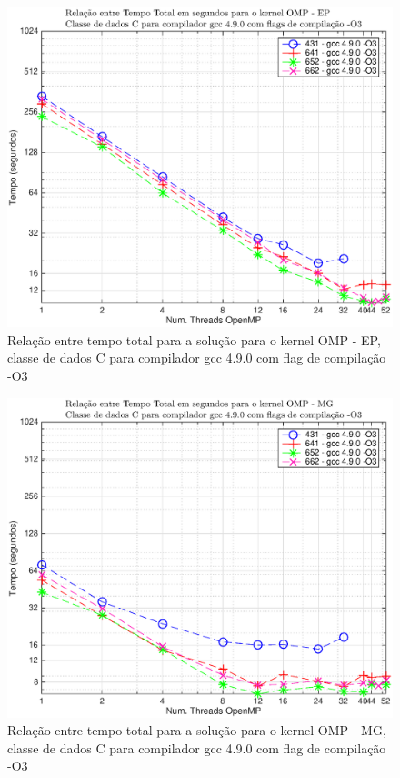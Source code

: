 \documentclass[conference,compsoc]{IEEEtran}
\begin{document}
\begin{figure}[H]
\centering
\includegraphics[width=1.1\columnwidth]{EPS/OMP/TEMPO_omp_ep_o3.eps}
\caption{Relação entre tempo total para a solução para o kernel OMP - EP, classe de dados C para  compilador gcc 4.9.0 com flag de compilação -O3}
\label{tempo_omp_ep_c}
\end{figure}

\begin{figure}[H]
\centering
\includegraphics[width=1.1\columnwidth]{EPS/OMP/TEMPO_omp_mg_o3.eps}
\caption{Relação entre tempo total para a solução para o kernel OMP - MG, classe de dados C para  compilador gcc 4.9.0 com flag de compilação -O3}
\label{tempo_omp_mg_c}
\end{figure}
\end{document}
